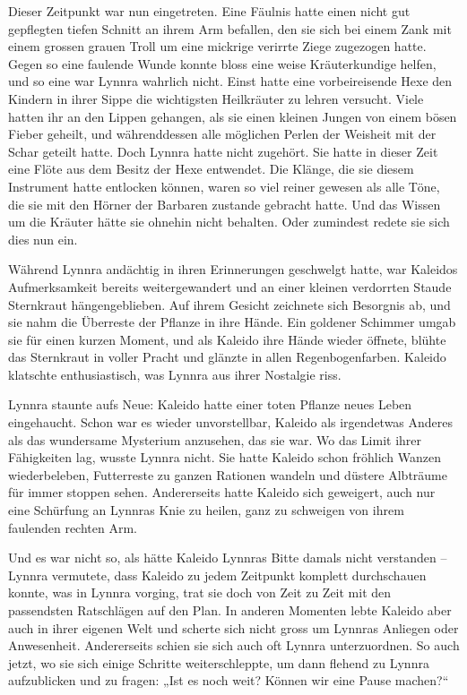 \documentclass[10pt, a4paper, oneside]{book}
\begin{document}
Dieser Zeitpunkt war nun eingetreten. Eine Fäulnis hatte einen nicht gut gepflegten tiefen Schnitt an ihrem Arm befallen, den sie sich bei einem Zank mit einem grossen grauen Troll um eine mickrige verirrte Ziege zugezogen hatte. Gegen so eine faulende Wunde konnte bloss eine weise Kräuterkundige helfen, und so eine war Lynnra wahrlich nicht. Einst hatte eine vorbeireisende Hexe den Kindern in ihrer Sippe die wichtigsten Heilkräuter zu lehren versucht. Viele hatten ihr an den Lippen gehangen, als sie einen kleinen Jungen von einem bösen Fieber geheilt, und währenddessen alle möglichen Perlen der Weisheit mit der Schar geteilt hatte. Doch Lynnra hatte nicht zugehört. Sie hatte in dieser Zeit eine Flöte aus dem Besitz der Hexe entwendet. Die Klänge, die sie diesem Instrument hatte entlocken können, waren so viel reiner gewesen als alle Töne, die sie mit den Hörner der Barbaren zustande gebracht hatte. Und das Wissen um die Kräuter hätte sie ohnehin nicht behalten. Oder zumindest redete sie sich dies nun ein.



Während Lynnra andächtig in ihren Erinnerungen geschwelgt hatte, war Kaleidos Aufmerksamkeit bereits weitergewandert und an einer kleinen verdorrten Staude Sternkraut hängengeblieben. Auf ihrem Gesicht zeichnete sich Besorgnis ab, und sie nahm die Überreste der Pflanze in ihre Hände. Ein goldener Schimmer umgab sie für einen kurzen Moment, und als Kaleido ihre Hände wieder öffnete, blühte das Sternkraut in voller Pracht und glänzte in allen Regenbogenfarben. Kaleido klatschte enthusiastisch, was Lynnra aus ihrer Nostalgie riss.



Lynnra staunte aufs Neue: Kaleido hatte einer toten Pflanze neues Leben eingehaucht. Schon war es wieder unvorstellbar, Kaleido als irgendetwas Anderes als das wundersame Mysterium anzusehen, das sie war. Wo das Limit ihrer Fähigkeiten lag, wusste Lynnra nicht. Sie hatte Kaleido schon fröhlich Wanzen wiederbeleben, Futterreste zu ganzen Rationen wandeln und düstere Albträume für immer stoppen sehen. Andererseits hatte Kaleido sich geweigert, auch nur eine Schürfung an Lynnras Knie zu heilen, ganz zu schweigen von ihrem faulenden rechten Arm.



Und es war nicht so, als hätte Kaleido Lynnras Bitte damals nicht verstanden – Lynnra vermutete, dass Kaleido zu jedem Zeitpunkt komplett durchschauen konnte, was in Lynnra vorging, trat sie doch von Zeit zu Zeit mit den passendsten Ratschlägen auf den Plan. In anderen Momenten lebte Kaleido aber auch in ihrer eigenen Welt und scherte sich nicht gross um Lynnras Anliegen oder Anwesenheit. Andererseits schien sie sich auch oft Lynnra unterzuordnen. So auch jetzt, wo sie sich einige Schritte weiterschleppte, um dann flehend zu Lynnra aufzublicken und zu fragen: „Ist es noch weit? Können wir eine Pause machen?“
\end{document}
